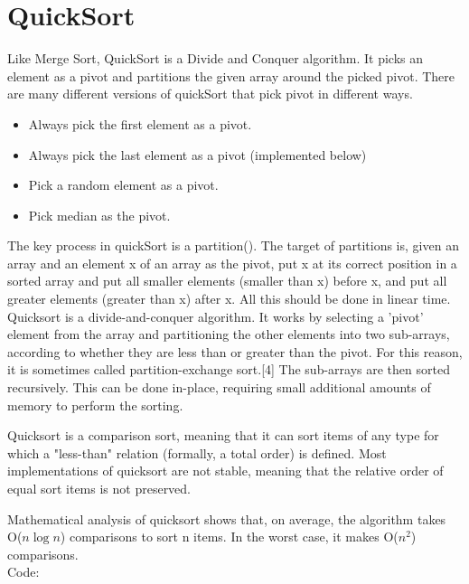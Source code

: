 


\section*{QuickSort}
        \noindent Like Merge Sort, QuickSort is a Divide and Conquer algorithm. It picks an element as a pivot and      partitions the given array around the picked pivot. There are many different versions of quickSort that pick pivot in different ways. 
                 \hfill\begin{itemize} 
                    \item Always pick the first element as a pivot.
                \item Always pick the last element as a pivot (implemented below)
                \item Pick a random element as a pivot.
                \item Pick median as the pivot.
            \end{itemize}
        The key process in quickSort is a partition(). The target of partitions is, given an array and an element x of an array as the pivot, put x at its correct position in a sorted array and put all smaller elements (smaller than x) before x, and put all greater elements (greater than x) after x. All this should be done in linear time.   
        Quicksort is a divide-and-conquer algorithm. It works by selecting a 'pivot' element from the array and partitioning the other elements into two sub-arrays, according to whether they are less than or greater than the pivot. For this reason, it is sometimes called partition-exchange sort.[4] The sub-arrays are then sorted recursively. This can be done in-place, requiring small additional amounts of memory to perform the sorting.

Quicksort is a comparison sort, meaning that it can sort items of any type for which a "less-than" relation (formally, a total order) is defined. Most implementations of quicksort are not stable, meaning that the relative order of equal sort items is not preserved.

    
Mathematical analysis of quicksort shows that, on average, the algorithm takes O($n\log n$) comparisons to sort n items. In the worst case, it makes O($n^2$) comparisons.\\
\noindent Code:

